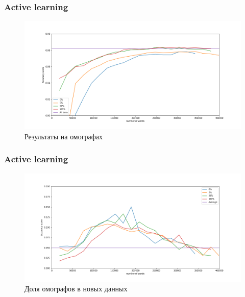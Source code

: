 \documentclass[russian]{beamer}
\begin{document}
\begin{frame}
\frametitle{Active learning}
\begin{figure}[H]
	\caption{Результаты на омографах}
	\begin{center}
		\includegraphics[width=1\linewidth]{Homo_scores}
	\end{center}
\end{figure}

\end{frame}

\begin{frame}
\frametitle{Active learning}
\begin{figure}[H]
	\caption{Доля омографов в новых данных}
	\begin{center}
		\includegraphics[width=1\linewidth]{Homo_perc}
	\end{center}
\end{figure}

\end{frame}
\end{document}
